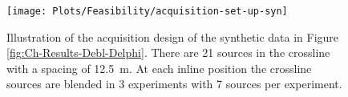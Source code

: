 \begin{figure}
	\centering
	\texttt{[image: Plots/Feasibility/acquisition-set-up-syn]}
	\caption{Illustration of the acquisition design of the synthetic data in Figure \ref{fig:Ch-Results-Debl-Delphi}. There are 21 sources in the crossline with a spacing of \SI{12.5}{\metre}. At each inline position the crossline sources are blended in 3 experiments with 7 sources per experiment.}
	\label{fig:Ch-Results-Feasibility-Set-Up}
\end{figure}







